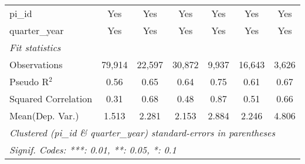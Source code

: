 \begin{tabular}{lcccccc}
   pi\_id                                                     & Yes           & Yes           & Yes           & Yes           & Yes           & Yes\\  
   quarter\_year                                              & Yes           & Yes           & Yes           & Yes           & Yes           & Yes\\  
   \midrule
   \emph{Fit statistics}\\
   Observations                                               & 79,914        & 22,597        & 30,872        & 9,937         & 16,643        & 3,626\\  
   Pseudo R$^2$                                               & 0.56          & 0.65          & 0.64          & 0.75          & 0.61          & 0.67\\  
   Squared Correlation                                        & 0.31          & 0.68          & 0.48          & 0.87          & 0.51          & 0.66\\  
Mean(Dep. Var.) & 1.513 & 2.281 & 2.153 & 2.884 & 2.246 & 4.806 \\
   \midrule \midrule
   \multicolumn{7}{l}{\emph{Clustered (pi\_id \& quarter\_year) standard-errors in parentheses}}\\
   \multicolumn{7}{l}{\emph{Signif. Codes: ***: 0.01, **: 0.05, *: 0.1}}\\
\end{tabular}
\par\endgroup
